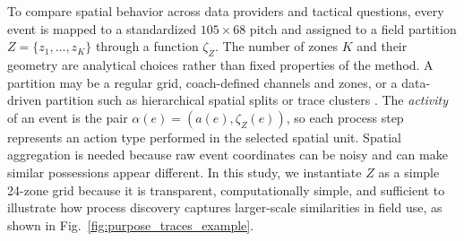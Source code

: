 
To compare spatial behavior across data providers and tactical questions, every event is mapped to a standardized $105\times68$ pitch and assigned to a field partition $Z=\{z_1,\dots,z_K\}$ through a function $\zeta_Z$. The number of zones $K$ and their geometry are analytical choices rather than fixed properties of the method. A partition may be a regular grid, coach-defined channels and zones, or a data-driven partition such as hierarchical spatial splits or trace clusters \cite{Clijmans2022,McCarthy2023}. The \emph{activity} of an event is the pair $\alpha(e)=(a(e),\zeta_Z(e))$, so each process step represents an action type performed in the selected spatial unit. Spatial aggregation is needed because raw event coordinates can be noisy and can make similar possessions appear different. In this study, we instantiate $Z$ as a simple 24-zone grid because it is transparent, computationally simple, and sufficient to illustrate how process discovery captures larger-scale similarities in field use, as shown in Fig.~\ref{fig:purpose_traces_example}.

%
